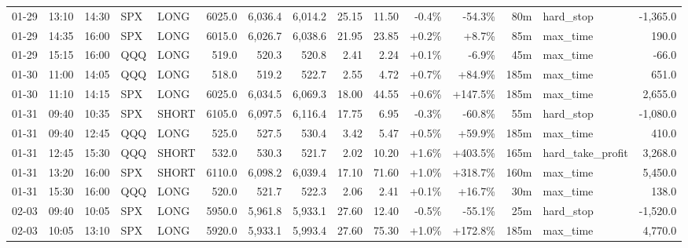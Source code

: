 \documentclass[11pt,a4paper,twoside]{article}
\begin{document}
\begin{landscape}
\begin{center}
\begin{longtable}{>{\color{txtmain}}l l l l l r r r r r r r r >{\color{txtmain}}l r}
01-29 & 13:10 & 14:30 & SPX & LONG & 6025.0 & 6,036.4 & 6,014.2 & 25.15 & 11.50 & \textcolor{lossred}{-0.4\%} & \textcolor{lossred}{-54.3\%} & 80m & hard\_stop & \textcolor{lossred}{-1,365.0} \\
01-29 & 14:35 & 16:00 & SPX & LONG & 6015.0 & 6,026.7 & 6,038.6 & 21.95 & 23.85 & \textcolor{wingreen}{+0.2\%} & \textcolor{wingreen}{+8.7\%} & 85m & max\_time & \textcolor{wingreen}{190.0} \\
01-29 & 15:15 & 16:00 & QQQ & LONG & 519.0 & 520.3 & 520.8 & 2.41 & 2.24 & \textcolor{wingreen}{+0.1\%} & \textcolor{lossred}{-6.9\%} & 45m & max\_time & \textcolor{lossred}{-66.0} \\
01-30 & 11:00 & 14:05 & QQQ & LONG & 518.0 & 519.2 & 522.7 & 2.55 & 4.72 & \textcolor{wingreen}{+0.7\%} & \textcolor{wingreen}{+84.9\%} & 185m & max\_time & \textcolor{wingreen}{651.0} \\
01-30 & 11:10 & 14:15 & SPX & LONG & 6025.0 & 6,034.5 & 6,069.3 & 18.00 & 44.55 & \textcolor{wingreen}{+0.6\%} & \textcolor{wingreen}{+147.5\%} & 185m & max\_time & \textcolor{wingreen}{2,655.0} \\
01-31 & 09:40 & 10:35 & SPX & SHORT & 6105.0 & 6,097.5 & 6,116.4 & 17.75 & 6.95 & \textcolor{lossred}{-0.3\%} & \textcolor{lossred}{-60.8\%} & 55m & hard\_stop & \textcolor{lossred}{-1,080.0} \\
01-31 & 09:40 & 12:45 & QQQ & LONG & 525.0 & 527.5 & 530.4 & 3.42 & 5.47 & \textcolor{wingreen}{+0.5\%} & \textcolor{wingreen}{+59.9\%} & 185m & max\_time & \textcolor{wingreen}{410.0} \\
01-31 & 12:45 & 15:30 & QQQ & SHORT & 532.0 & 530.3 & 521.7 & 2.02 & 10.20 & \textcolor{wingreen}{+1.6\%} & \textcolor{wingreen}{+403.5\%} & 165m & hard\_take\_profit & \textcolor{wingreen}{3,268.0} \\
01-31 & 13:20 & 16:00 & SPX & SHORT & 6110.0 & 6,098.2 & 6,039.4 & 17.10 & 71.60 & \textcolor{wingreen}{+1.0\%} & \textcolor{wingreen}{+318.7\%} & 160m & max\_time & \textcolor{wingreen}{5,450.0} \\
01-31 & 15:30 & 16:00 & QQQ & LONG & 520.0 & 521.7 & 522.3 & 2.06 & 2.41 & \textcolor{wingreen}{+0.1\%} & \textcolor{wingreen}{+16.7\%} & 30m & max\_time & \textcolor{wingreen}{138.0} \\
02-03 & 09:40 & 10:05 & SPX & LONG & 5950.0 & 5,961.8 & 5,933.1 & 27.60 & 12.40 & \textcolor{lossred}{-0.5\%} & \textcolor{lossred}{-55.1\%} & 25m & hard\_stop & \textcolor{lossred}{-1,520.0} \\
02-03 & 10:05 & 13:10 & SPX & LONG & 5920.0 & 5,933.1 & 5,993.4 & 27.60 & 75.30 & \textcolor{wingreen}{+1.0\%} & \textcolor{wingreen}{+172.8\%} & 185m & max\_time & \textcolor{wingreen}{4,770.0} \\

\end{longtable}
\end{center}
\end{landscape}
\end{document}
